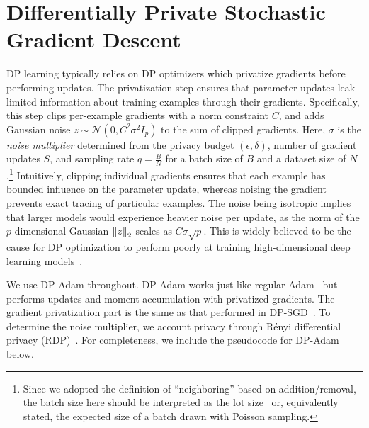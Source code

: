 \section[Differentially Private Stochastic Gradient Descent]{\large Differentially Private Stochastic Gradient Descent}

DP learning typically relies on DP optimizers which privatize gradients before performing updates. 
The privatization step ensures that parameter updates leak limited information about training examples through their gradients.
Specifically, this step clips per-example gradients with a norm constraint $C$, and adds Gaussian noise $z\sim\mathcal{N}(0, C^2\sigma^2 I_p)$ to the sum of clipped gradients.
Here, $\sigma$ is the \textit{noise multiplier} determined from the privacy budget $(\epsilon, \delta)$, number of gradient updates $S$, and sampling rate $q=\tfrac{B}{N}$ for a batch size of $B$ and a dataset size of $N$.\footnote{Since we adopted the definition of ``neighboring'' based on addition/removal, the batch size here should be interpreted as the lot size~\citep{abadi2016deep} or, equivalently stated, the expected size of a batch drawn with Poisson sampling.}
Intuitively, clipping individual gradients ensures that each example has bounded influence on the parameter update, whereas noising the gradient prevents exact tracing of particular examples.
The noise being isotropic implies that larger models would experience heavier noise per update, as the norm of the $p$-dimensional Gaussian $\left\lVert z\right\rVert_2$ scales as $C \sigma \sqrt{p}$.
This is widely believed to be the cause for DP optimization to perform poorly at training high-dimensional deep learning models~\citep{gautum14,yu2021not}.

We use DP-Adam throughout. DP-Adam works just like regular Adam~\citep{kingma2014adam} but performs updates and moment accumulation with privatized gradients. 
The gradient privatization part is the same as that performed in DP-SGD~\citep{song2013stochastic,abadi2016deep}.
To determine the noise multiplier, we account privacy through R\'enyi differential privacy (RDP)~\citep{mironov2017renyi,mironov2019r}.
For completeness, we include the pseudocode for DP-Adam below. 

